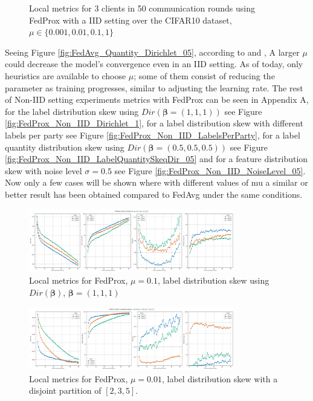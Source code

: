 \begin{figure}[H]
    \caption{Local metrics for 3 clients in 50 communication rounds using FedProx with a IID setting over the CIFAR10 dataset, $\mu \in \{0.001, 0.01, 0.1, 1\}$}
    \label{fig:FedProx_IID}
\end{figure}

Seeing Figure \ref{fig:FedAvg_Quantity_Dirichlet_05}, according to \cite*{li2020} and \cite*{li2021}, A larger $\mu$  could decrease the model's convergence even in an IID setting. As of today, only heuristics are available to choose $\mu$; some of them consist of reducing the parameter as training progresses, similar to adjusting the learning rate. The rest of Non-IID setting experiments metrics with FedProx can be seen in Appendix A, for the label distribution skew using $Dir(\boldsymbol{\beta} = (1,1,1))$ see Figure \ref{fig:FedProx_Non_IID_Dirichlet_1}, for a label distribution skew with different labels per party see Figure \ref{fig:FedProx_Non_IID_LabelsPerParty}, for a label quantity distribution skew using $Dir(\boldsymbol{\beta}=(0.5,0.5,0.5))$ see Figure \ref{fig:FedProx_Non_IID_LabelQuantitySkeqDir_05} and for a feature distribution skew with noise level $\sigma = 0.5$ see Figure \ref{fig:FedProx_Non_IID_NoiseLevel_05}.\\
Now only a few cases will be shown where with different values of mu a similar or better result has been obtained compared to FedAvg under the same conditions.

\begin{figure}[H]
  \centering
  \includegraphics[width=0.8\textwidth]{figures/2-Federated_Learning/FedProx_Dirichlet_1_mu_0.1.png}
  \caption{Local metrics for FedProx, $\mu = 0.1$, label distribution skew using $Dir(\boldsymbol{\beta})$, $\boldsymbol{\beta} = (1,1,1)$}
  \label{fig:FedProx_LabelsSkewDir_1_Mu_0.1}
\end{figure}

\begin{figure}[H]
  \centering
  \includegraphics[width=0.8\textwidth]{figures/2-Federated_Learning/FedProx_LabelsPerParty_mu_0.01.png}
  \caption{Local metrics for FedProx, $\mu = 0.01$, label distribution skew with a disjoint partition of $[2,3,5]$.}
  \label{fig:FedProx_LabelsPerParty_Mu_0.01}
\end{figure}

